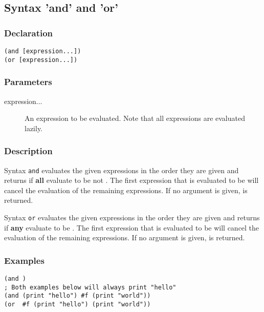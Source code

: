 \subsection{Syntax 'and' and 'or'}
\label{builtins/and-or}

\subsubsection*{Declaration}
\begin{lstlisting}
(and [expression...])
(or [expression...])
\end{lstlisting}

\subsubsection*{Parameters}
\begin{description}
	\item[expression...] An expression to be evaluated. Note that all expressions are evaluated lazily.
\end{description}

\subsubsection*{Description}
Syntax \lstinline|and| evaluates the given expressions in the order they are given and returns \true{} if \textbf{all} evaluate to be not \false{}. The first expression that is evaluated to be \false{} will cancel the evaluation of the remaining expressions. If no argument is given, \true{} is returned.

Syntax \lstinline|or| evaluates the given expressions in the order they are given and returns \true if \textbf{any} evaluate to be \true{}. The first expression that is evaluated to be \true{} will cancel the evaluation of the remaining expressions. If no argument is given, \false{} is returned.

\subsubsection*{Examples}
\begin{lstlisting}
(and )
; Both examples below will always print "hello"
(and (print "hello") #f (print "world"))
(or  #f (print "hello") (print "world"))
\end{lstlisting}

